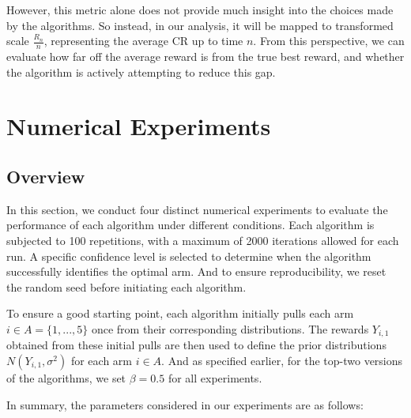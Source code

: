 \documentclass[a4paper, 12pt]{article}
\theoremstyle{definition}
\begin{document}
However, this metric alone does not provide much insight into the choices made by the algorithms. So instead, in our analysis, it will be mapped to transformed scale $\frac{R_n}{n}$, representing the average CR up to time $n$. From this perspective, we can evaluate how far off the average reward is from the true best reward, and whether the algorithm is actively attempting to reduce this gap.



\section{Numerical Experiments}
\subsection{Overview}
In this section, we conduct four distinct numerical experiments to evaluate the performance of each algorithm under different conditions. Each algorithm is subjected to 100 repetitions, with a maximum of 2000 iterations allowed for each run. A specific confidence level is selected to determine when the algorithm successfully identifies the optimal arm. And to ensure reproducibility, we reset the random seed before initiating each algorithm.

To ensure a good starting point, each algorithm initially pulls each arm $i \in A = \{1, ..., 5\}$ once from their corresponding distributions. The rewards $Y_{i,1}$ obtained from these initial pulls are then used to define the prior distributions $N(Y_{i,1}, \sigma^2)$ for each arm $i\in A$. And as specified earlier, for the top-two versions of the algorithms, we set $\beta = 0.5$ for all experiments. 

In summary, the parameters considered in our experiments are as follows:
\end{document}
